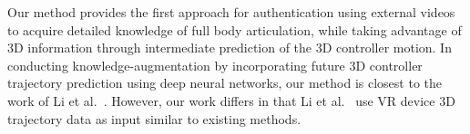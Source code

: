 Our method provides the first approach for authentication using external videos to acquire detailed knowledge of full body articulation, while taking advantage of 3D information through intermediate prediction of the 3D controller motion. In conducting knowledge-augmentation by incorporating future 3D controller trajectory prediction using deep neural networks, our method is closest to the work of Li et al.~\cite{li2024using}. However, our work differs in that Li et al.~\cite{li2024using} use VR device 3D trajectory data as input similar to existing methods.